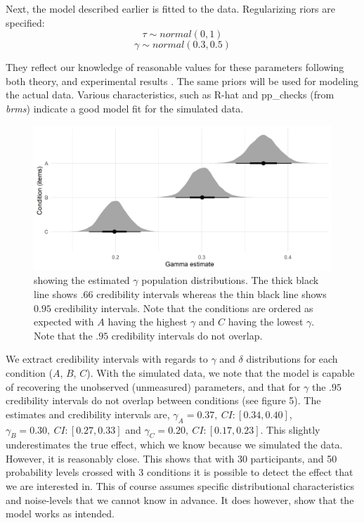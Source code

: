 \documentclass[12pt]{article}
\begin{document}
Next, the model described earlier is fitted
to the data. Regularizing riors are specified:
\[
	\tau \sim normal(0, 1)
\]
\[
	\gamma \sim normal(0.3, 0.5)
\]

They reflect our knowledge of reasonable values for
these parameters following both theory, and
experimental results \autocite{gonzalez1999shape}.
The same priors will be used for
modeling the actual data. Various characteristics,
such as R-hat and pp\_checks (from \emph{brms})
indicate a good model fit for the simulated data. \\

\begin{figure}[H]
	\includegraphics[width = \linewidth]{../Figures/gamma.png}
	\caption{showing the estimated  $\gamma$
	population distributions. The thick
	black line shows  $.66$ credibility intervals
	whereas the thin black line shows  $0.95$
	credibility intervals. Note that the
	conditions are ordered as expected with
	 $A$ having the highest  $\gamma$ and
	 $C$ having the lowest  $\gamma$.
	 Note that the  $.95$ credibility
	 intervals do not overlap.}
 \end{figure}

We extract credibility intervals with regards
to $\gamma$ and $\delta$ distributions for each
condition ($A$, $B$, $C$). With the simulated
data, we note that the model is capable of
recovering the unobserved (unmeasured) parameters,
and that for $\gamma$ the  $.95$ credibility
intervals do not overlap between conditions
(see figure 5). The estimates and credibility intervals
are, $\gamma_{A} = 0.37, \: CI: [0.34, 0.40]$,
$\gamma_{B} = 0.30, \: CI: [0.27, 0.33]$ and
$\gamma_{C} = 0.20, \: CI: [0.17, 0.23]$.
This slightly underestimates the true effect, which
we know because we simulated the data. However, it
is reasonably close. This shows that with $30$
participants, and 50 probability levels crossed with
3 conditions it is possible to detect the effect
that we are interested in. This of course assumes specific
distributional characteristics and noise-levels
that we cannot know in advance. It does however, show
that the model works as intended.
\end{document}
